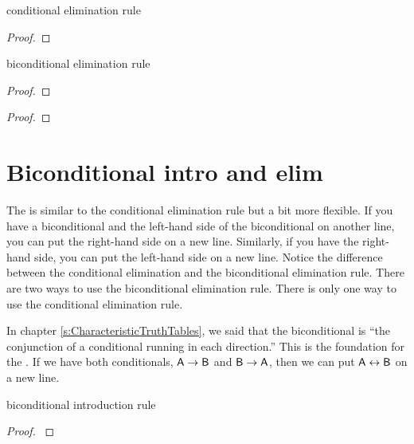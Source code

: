 \medskip
\begin{tcbraster}[raster columns=2, raster valign=top]
\begin{factboxy}{conditional elimination rule}\label{ce-rule}
\begin{proof}
	 
\end{proof}
\end{factboxy}
\begin{factboxy}{biconditional elimination rule}\label{be-rule}
\begin{proof}
	 
\end{proof}

\begin{proof}
	 
\end{proof}
\end{factboxy}
\end{tcbraster}


\section{Biconditional intro and elim}\label{s:bi-rules}

The  is similar to the conditional elimination rule but a bit more flexible. If you have a biconditional and the left-hand side of the biconditional on another line, you can put the right-hand side on a new line. Similarly, if you have the right-hand side, you can put the left-hand side on a new line. Notice the difference between the conditional elimination and the biconditional elimination rule. There are two ways to use the biconditional elimination rule. There is only one way to use the conditional elimination rule.

In chapter \ref{s:CharacteristicTruthTables}, we said that the biconditional is ``the conjunction of a conditional running in each direction.'' This is the foundation for the . If we have both conditionals, $\mathsf{A} \rightarrow \mathsf{B}$ and $\mathsf{B} \rightarrow \mathsf{A}$, then we can put $\mathsf{A} \leftrightarrow \mathsf{B}$ on a new line.

\begin{factboxy-width}[width=7.5cm]{biconditional introduction rule}
\begin{proof}\label{eiff-I}
	 
\end{proof}
\end{factboxy-width}



